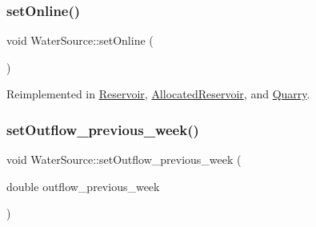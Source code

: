 \mbox{\label{classWaterSource_ab3396e2915db91a6c82e0f29c7889df4_ab3396e2915db91a6c82e0f29c7889df4}} 
\subsubsection{\texorpdfstring{set\+Online()}{setOnline()}}
{\footnotesize\ttfamily void Water\+Source\+::set\+Online (\begin{DoxyParamCaption}{ }\end{DoxyParamCaption})\hspace{0.3cm}{\ttfamily [virtual]}}



Reimplemented in \mbox{\hyperlink{classReservoir_ac6f64dd92c401e58095e7b125855041b_ac6f64dd92c401e58095e7b125855041b}{Reservoir}}, \mbox{\hyperlink{classAllocatedReservoir_a739d93f7981f597a3db0a3d613304b8e_a739d93f7981f597a3db0a3d613304b8e}{Allocated\+Reservoir}}, and \mbox{\hyperlink{classQuarry_af5fe04fa188d399485b2b4e64381e169_af5fe04fa188d399485b2b4e64381e169}{Quarry}}.

\mbox{\label{classWaterSource_ab53d376a425b8db603382ba27b52b1d4_ab53d376a425b8db603382ba27b52b1d4}} 
\subsubsection{\texorpdfstring{set\+Outflow\+\_\+previous\+\_\+week()}{setOutflow\_previous\_week()}}
{\footnotesize\ttfamily void Water\+Source\+::set\+Outflow\+\_\+previous\+\_\+week (\begin{DoxyParamCaption}\item[{double}]{outflow\+\_\+previous\+\_\+week }\end{DoxyParamCaption})}

\mbox{\label{classWaterSource_af72660e62fda45b6ae53da5f0afd86db_af72660e62fda45b6ae53da5f0afd86db}} 
